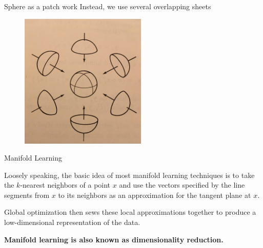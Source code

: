 \documentclass{beamer}
\begin{document}
\begin{frame}{Sphere as a patch work}
	Instead, we use several overlapping sheets 
\begin{figure}[h]
	\centering
	\includegraphics[width=6cm]{../../Figures/fig_manifold_sphere_2.jpg}
\end{figure}		
	
	
\end{frame}

\begin{frame}{Manifold Learning }
	
	Loosely speaking, the basic idea of most manifold learning techniques is to take the $k$-nearest neighbors of a point $x$ and use the vectors specified by the line segments from $x$ to its neighbors as an approximation for the tangent plane at $x$. 
	
	Global optimization then sews these local approximations together to produce a low-dimensional representation of the data. 
	
\begin{center}
\textbf{Manifold learning is also known as dimensionality reduction.} 
\end{center}
\end{frame}
\end{document}
